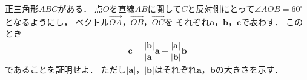 \documentclass[../../main.tex]{subfiles}
\begin{document}
正三角形$ABC$がある．
点$O$を直線$AB$に関して$C$と反対側にとって$\angle AOB={60}^\circ$となるようにし，
ベクトル$\overrightarrow{OA}$，$\overrightarrow{OB}$，$\overrightarrow{OC}$を
それぞれ$\mathbf{a}$，$\mathbf{b}$，$\mathbf{c}$で表わす．
このとき
\begin{align*}
  \mathbf{c}=\dfrac{|\mathbf{b}|}{|\mathbf{a}|}\mathbf{a}+\dfrac{|\mathbf{a}|}{|\mathbf{b}|}\mathbf{b}
\end{align*}
であることを証明せよ．
ただし$|\mathbf{a}|$，$|\mathbf{b}|$はそれぞれ$\mathbf{a}$，$\mathbf{b}$の大きさを示す．
\end{document}
